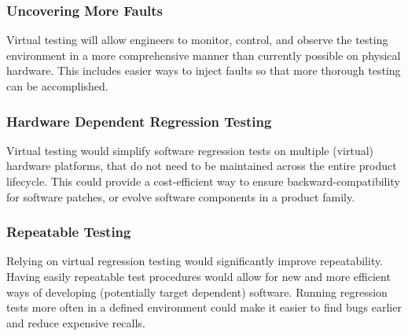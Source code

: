\subsubsection{Uncovering More Faults}
Virtual testing will allow engineers to monitor, control, and observe the testing environment in a more comprehensive manner than currently possible on physical hardware.
This includes easier ways to inject faults so that more thorough testing can be accomplished.

\subsubsection{Hardware Dependent Regression Testing}
Virtual testing would simplify software regression tests on multiple (virtual) hardware platforms,
that do not need to be maintained across the entire product lifecycle.
This could provide a cost-efficient way to ensure backward-compatibility for software patches,
or evolve software components in a product family.

\subsubsection{Repeatable Testing}
Relying on virtual regression testing would significantly improve repeatability.
Having easily repeatable test procedures would allow for new and more efficient ways of developing (potentially target dependent) software.
Running regression tests more often in a defined environment could make it easier to find bugs earlier and reduce expensive recalls.

